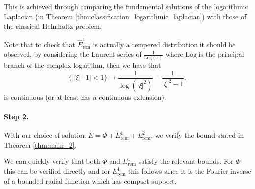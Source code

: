 \documentclass[11pt]{amsart}
\begin{document}
This is achieved through comparing the fundamental solutions of the logarithmic Laplacian (in Theorem \ref{thm:classification_logarithmic_laplacian}) with those of the classical Helmholtz problem. 

Note that to check that $\hat{E}^1_{\text{rem}}$ is actually a tempered distribution it should be observed, by considering the Laurent series of $\tfrac{1}{\text{Log}(z)}$ where $\text{Log}$ is the principal branch of the complex logarithm, then we have that 
\begin{equation*}
	\{||\xi|-1|<1\}\mapsto \frac{1}{\log(|\xi|^2)}-\frac{1}{|\xi|^2-1},
\end{equation*}
is continuous (or at least has a continuous extension). 



\paragraph{Step 2.}

With our choice of solution $E=\Phi+E_{\text{rem}}^{1}+E_{\text{rem}}^{2}$, we verify the bound stated in Theorem \ref{thm:main_2}. 

We can quickly verify that both $\Phi$ and $E_{\text{rem}}^{1}$ satisfy the relevant bounds. For $\Phi$ this can be verified directly and for $E_{\text{rem}}^{1}$ this follows since it is the Fourier inverse of a bounded radial function which has compact support. 
\end{document}
